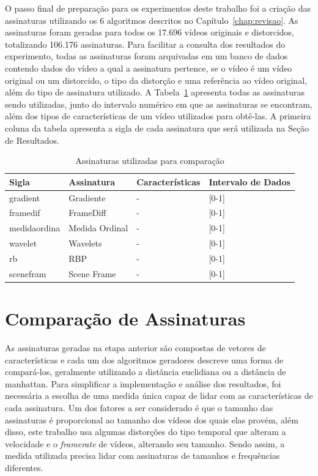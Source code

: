 O passo final de preparação para os experimentos deste trabalho foi a criação das assinaturas utilizando os 6 algoritmos descritos no Capítulo~\ref{chap:revisao}. As assinaturas foram geradas para todos os 17.696 vídeos originais e distorcidos, totalizando 106.176 assinaturas. Para facilitar a consulta dos resultados do experimento, todas as assinaturas foram arquivadas em um banco de dados contendo dados do vídeo a qual a assinatura pertence, se o vídeo é um vídeo original ou um distorcido, o tipo da distorção e uma referência ao vídeo original, além do tipo de assinatura utilizado. A Tabela~\ref{tab:assinaturas} apresenta todas as assinaturas sendo utilizadas, junto do intervalo numérico em que as assinaturas se encontram, além dos tipos de características de um vídeo utilizados para obtê-las. A primeira coluna da tabela apresenta a sigla de cada assinatura que será utilizada na Seção de Resultados.

\begin{table}[h]
    \centering
    \caption{Assinaturas utilizadas para comparação}
    \label{tab:assinaturas}
    \begin{tabular}{|p{}|p{}|p{}|p{}|} \hline
        \textbf{Sigla} & \textbf{Assinatura} & \textbf{Características} & \textbf{Intervalo de Dados} \\ \hline
        gradient & Gradiente & - & [0-1] \\ \hline
        framedif & FrameDiff & - & [0-1] \\ \hline
        medidaordina & Medida Ordinal & - & [0-1] \\ \hline
        wavelet & Wavelets & - & [0-1] \\ \hline
        rb & RBP & - & [0-1] \\ \hline
        scenefram & Scene Frame & - & [0-1] \\ \hline
    \end{tabular}
\end{table}

\section{Comparação de Assinaturas}
\label{sec:met-comparacao}

As assinaturas geradas na etapa anterior são compostas de vetores de características e cada um dos algoritmos geradores descreve uma forma de compará-los, geralmente utilizando a distância euclidiana ou a distância de manhattan. Para simplificar a implementação e análise dos resultados, foi necessária a escolha de uma medida única capaz de lidar com as características de cada assinatura. Um dos fatores a ser considerado é que o tamanho das assinaturas é proporcional ao tamanho dos vídeos dos quais elas provém, além disso, este trabalho usa algumas distorções do tipo temporal que alteram a velocidade e o \textit{framerate} de vídeos, alterando seu tamanho. Sendo assim, a medida utilizada precisa lidar com assinaturas de tamanhos e frequências diferentes.


